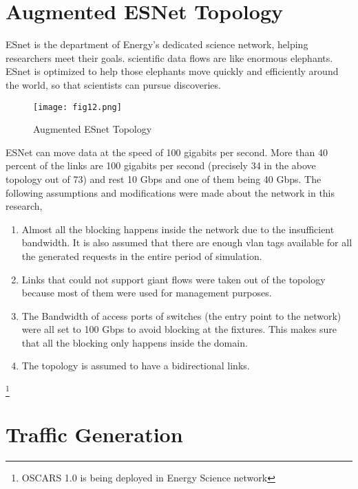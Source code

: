 
\noindent 

\section {Augmented ESNet Topology}
ESnet is the department of Energy's dedicated science network, helping researchers meet their goals. scientific data flows are like enormous elephants. ESnet is optimized to help those elephants move quickly and efficiently around the world, so that scientists can pursue discoveries.

\begin{figure}[hbt!]
\centering
\texttt{[image: fig12.png]}
\caption{Augmented ESnet Topology}
\label{fig:esnetTopo}
\end{figure}


\indent ESNet can move data at the speed of 100 gigabits per second. More than 40 percent of the links are 100 gigabits per second (precisely 34 in the above topology out of 73) and rest 10 Gbps and one of them being 40 Gbps. The following assumptions and modifications were made about the network in this research,

\begin{enumerate} [leftmargin=*]
\item Almost all the blocking happens inside the network due to the insufficient bandwidth. It is also assumed that there are enough vlan tags available for all the generated requests in the entire period of simulation.   
\item Links that could not support giant flows were taken out of the topology because most of them were used for management purposes. 
\item The Bandwidth of access ports of switches (the entry point to the network) were all set to 100 Gbps to avoid blocking at the fixtures. This makes sure that all the blocking only happens inside the domain.
\item The topology is assumed to have a bidirectional links.
\end{enumerate}

\footnote {OSCARS 1.0 is being deployed in Energy Science network}

\section {Traffic Generation}

